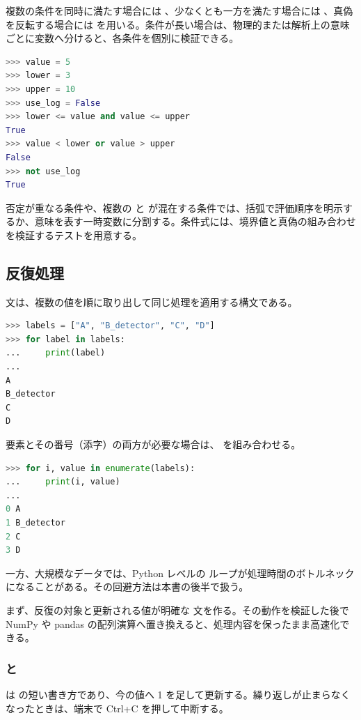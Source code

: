 複数の条件を同時に満たす場合には 、少なくとも一方を満たす場合には 、真偽を反転する場合には  を用いる。条件が長い場合は、物理的または解析上の意味ごとに変数へ分けると、各条件を個別に検証できる。

\begin{lstlisting}[language=Python, numbers=none, xleftmargin=2\zw]
>>> value = 5
>>> lower = 3
>>> upper = 10
>>> use_log = False
>>> lower <= value and value <= upper
True
>>> value < lower or value > upper
False
>>> not use_log
True
\end{lstlisting}

否定が重なる条件や、複数の  と  が混在する条件では、括弧で評価順序を明示するか、意味を表す一時変数に分割する。条件式には、境界値と真偽の組み合わせを検証するテストを用意する。

\subsection{反復処理}

 文は、複数の値を順に取り出して同じ処理を適用する構文である。

\begin{lstlisting}[language=Python, numbers=none, xleftmargin=2\zw]
>>> labels = ["A", "B_detector", "C", "D"]
>>> for label in labels:
...     print(label)
...
A
B_detector
C
D
\end{lstlisting}

要素とその番号（添字）の両方が必要な場合は、 を組み合わせる。

\begin{lstlisting}[language=Python, numbers=none, xleftmargin=2\zw]
>>> for i, value in enumerate(labels):
...     print(i, value)
...
0 A
1 B_detector
2 C
3 D
\end{lstlisting}

一方、大規模なデータでは、Python レベルの  ループが処理時間のボトルネックになることがある。その回避方法は本書の後半で扱う。

まず、反復の対象と更新される値が明確な  文を作る。その動作を検証した後で NumPy や pandas の配列演算へ置き換えると、処理内容を保ったまま高速化できる。

\subsubsection{ と }

 は  の短い書き方であり、今の値へ 1 を足して更新する。繰り返しが止まらなくなったときは、端末で Ctrl+C を押して中断する。

